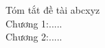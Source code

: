 \documentclass{standalone}
\begin{document}
	Tóm tắt đề tài abcxyz\\
	
	Chương 1:.....\\
	
	Chương 2:.....
\end{document}
